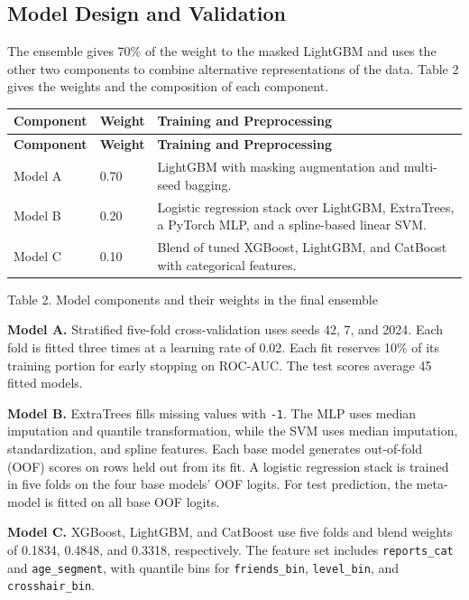 \documentclass[11pt,a4paper]{article}
\newcommand{\reserveheading}[1]{\par\ifdim\dimexpr\pagegoal-\pagetotal\relax<#1\relax\newpage\fi}
\begin{document}
\reserveheading{11\baselineskip}
\subsection{Model Design and Validation}

The ensemble gives 70\% of the weight to the masked LightGBM and uses the other two components to combine alternative representations of the data. Table 2 gives the weights and the composition of each component.

\begingroup\small
\begin{longtable}{@{}L{.15\linewidth}L{.11\linewidth}L{.67\linewidth}@{}}
\toprule
\textbf{Component} & \textbf{Weight} & \textbf{Training and Preprocessing} \\
\midrule
\endfirsthead
\toprule
\textbf{Component} & \textbf{Weight} & \textbf{Training and Preprocessing} \\
\midrule
\endhead
\bottomrule
\endfoot
Model A & 0.70 & LightGBM with masking augmentation and multi-seed bagging. \\
Model B & 0.20 & Logistic regression stack over LightGBM, ExtraTrees, a PyTorch MLP, and a spline-based linear SVM. \\
Model C & 0.10 & Blend of tuned XGBoost, LightGBM, and CatBoost with categorical features. \\
\end{longtable}
\endgroup

{\centering\small Table 2. Model components and their weights in the final ensemble\par}\medskip

\textbf{Model A.} Stratified five-fold cross-validation uses seeds 42, 7, and 2024. Each fold is fitted three times at a learning rate of 0.02. Each fit reserves 10\% of its training portion for early stopping on ROC-AUC. The test scores average 45 fitted models.

\textbf{Model B.} ExtraTrees fills missing values with \texttt{-1}. The MLP uses median imputation and quantile transformation, while the SVM uses median imputation, standardization, and spline features. Each base model generates out-of-fold (OOF) scores on rows held out from its fit. A logistic regression stack is trained in five folds on the four base models' OOF logits. For test prediction, the meta-model is fitted on all base OOF logits.

\textbf{Model C.} XGBoost, LightGBM, and CatBoost use five folds and blend weights of 0.1834, 0.4848, and 0.3318, respectively. The feature set includes \texttt{reports\_\allowbreak{}cat} and \texttt{age\_\allowbreak{}segment}, with quantile bins for \texttt{friends\_\allowbreak{}bin}, \texttt{level\_\allowbreak{}bin}, and \texttt{crosshair\_\allowbreak{}bin}.
\end{document}
